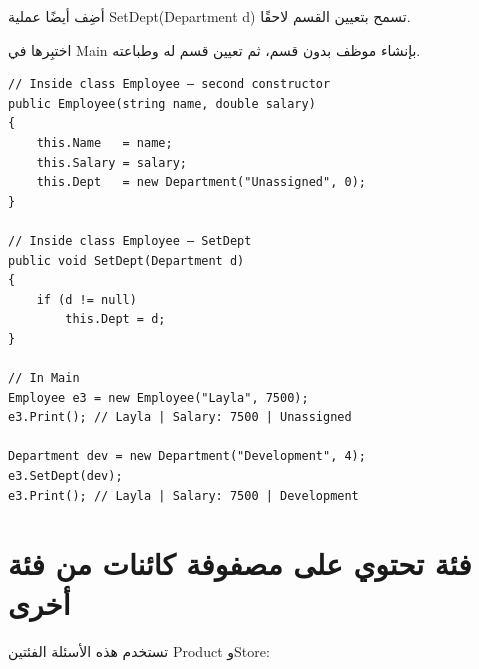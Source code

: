 \documentclass[14pt]{extarticle}
\begin{document}
\begin{enumerate}
أضِف أيضًا عملية \textenglish{SetDept(Department d)} تسمح بتعيين القسم لاحقًا.

اختبِرها في \textenglish{Main} بإنشاء موظف بدون قسم، ثم تعيين قسم له وطباعته.

\ifwithsols
\begin{boxSolution}
\begin{english}
{\small
\begin{verbatim}
// Inside class Employee — second constructor
public Employee(string name, double salary)
{
    this.Name   = name;
    this.Salary = salary;
    this.Dept   = new Department("Unassigned", 0);
}

// Inside class Employee — SetDept
public void SetDept(Department d)
{
    if (d != null)
        this.Dept = d;
}

// In Main
Employee e3 = new Employee("Layla", 7500);
e3.Print(); // Layla | Salary: 7500 | Unassigned

Department dev = new Department("Development", 4);
e3.SetDept(dev);
e3.Print(); // Layla | Salary: 7500 | Development
\end{verbatim}
}
\end{english}
\end{boxSolution}
\fi

\end{enumerate}

\clearpage
\section{فئة تحتوي على مصفوفة كائنات من فئة أخرى}

تستخدم هذه الأسئلة الفئتين \textenglish{Product} و\textenglish{Store}:
\end{document}
